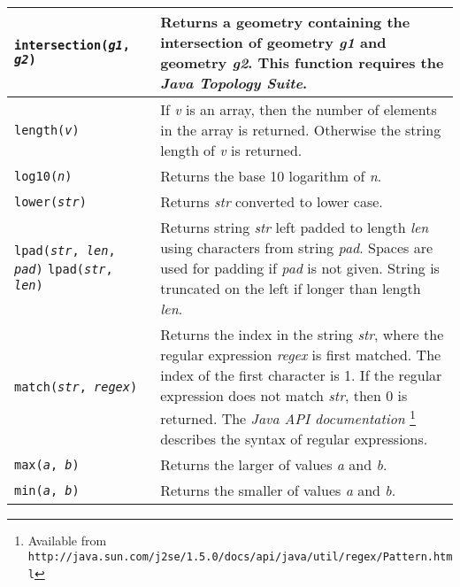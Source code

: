 \begin{longtable}{|p{5cm}|p{7cm}|}
\hline

\texttt{intersection(\textit{g1}, \textit{g2})} &
Returns a geometry containing the intersection
of geometry \textit{g1} and geometry \textit{g2}.
This function requires the \textit{Java Topology Suite}. \\

\hline

\texttt{length(\textit{v})} &
If \textit{v} is an array, then the number of elements in the
array is returned.  Otherwise the string length of \textit{v} is returned. \\

\hline

\texttt{log10(\textit{n})} &
Returns the base 10 logarithm of \textit{n}. \\

\hline

\texttt{lower(\textit{str})} &
Returns \textit{str} converted to lower case. \\

\hline

\texttt{lpad(\textit{str}, \textit{len}, \textit{pad})}
\texttt{lpad(\textit{str}, \textit{len})} &
Returns string \textit{str} left padded to length \textit{len}
using characters from string \textit{pad}.
Spaces are used for padding if \textit{pad} is not given.
String is truncated on the left if longer than length \textit{len}. \\

\hline

\texttt{match(\textit{str}, \textit{regex})} &
Returns the index in the string \textit{str}, where the regular expression
\textit{regex} is first matched.  The index of the first character is 1.
If the regular expression does not match \textit{str}, then 0 is returned.
The \textit{Java API documentation}
\footnote{Available from \texttt{http://java.sun.com/j2se/1.5.0/docs/api/java/util/regex/Pattern.html}}
describes the syntax of regular expressions. \\

\hline

\texttt{max(\textit{a}, \textit{b})} &
Returns the larger of values \textit{a} and \textit{b}. \\

\hline

\texttt{min(\textit{a}, \textit{b})} &
Returns the smaller of values \textit{a} and \textit{b}. \\

\hline


\end{longtable}
